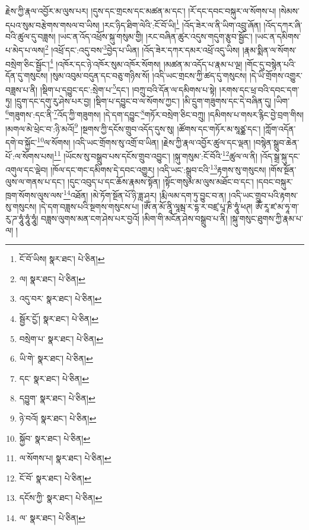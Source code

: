 རྗེས་ཀྱི་རྣལ་འབྱོར་མ་ལུས་པར། །དུས་དང་གྲངས་དང་མཚན་མ་དང་། །རོ་དང་དབང་བསྐུར་ལ་སོགས་པ། །སེམས་དཔའ་སུམ་བརྩེགས་གསལ་བ་ཡིས། །རང་ཉིད་ཐིག་ལེའི་:ངོ་བོ་ཡི།\footnote{ངོ་བོ་ཡིས།  སྣར་ཐང་།  པེ་ཅིན། } །འོད་ཟེར་ལ་ནི་ཡིག་འབྲུ་ཞོན། །འོད་དཀར་ཞི་བའི་ཚུལ་དུ་བཟླས། །ཡང་ན་འོད་འཕྲོས་སྐུ་གསུམ་གྱི། །རང་བཞིན་ཚུར་འདུས་གདུག་རྩུབ་སྦྱོང་། །ཡང་ན་དམིགས་པ་མེད་པ་ལས།\footnote{ལ།  སྣར་ཐང་།  པེ་ཅིན། } །འཕྲོ་དང་:འདུ་བས་\footnote{འདུ་བར་  སྣར་ཐང་།  པེ་ཅིན། }བྱེད་པ་ཡིན། །འོད་ཟེར་དཀར་དམར་འཕྲོ་འདུ་ཡིས། །རྣམ་སྨིན་ལ་སོགས་བསྲེག་ཅིང་སྦྱོང་།\footnote{སྦྱོར་ྱོང་།  སྣར་ཐང་།  པེ་ཅིན། } །འཁོར་དང་ཉེ་འཁོར་སུམ་འཁོར་སོགས། །མཚན་མ་འདོད་པ་རྣམ་པ་ལྔ། །གོང་དུ་བསྙེན་པའི་དོན་དུ་གསུངས། །སུམ་འབུམ་བདུན་དང་བཅུ་གཉིས་སོ། །འདི་ཡང་གྲངས་ཀྱི་ཚད་དུ་གསུངས། །དེ་ཡི་གྲོགས་འགྱུར་བཟླས་པ་ནི། །སྡིག་པ་དབྱུང་དང་:སྲེག་པ་\footnote{བསྲེག་པ་  སྣར་ཐང་།  པེ་ཅིན། }དང་། །བཀྲུ་བའི་དོན་ལ་དམིགས་པ་སྟེ། །རགས་དང་ཕྲ་བའི་དབང་དག་ཏུ། །དྲུག་དང་དགུ་རུ་ཤེས་པར་བྱ། །སྡིག་པ་དབྱུང་བ་ལ་སོགས་ཀྱང་། །མི་དྲུག་གཟུགས་དང་དེ་བཞིན་དུ། །ཡིག་\footnote{ཡི་གེ་  སྣར་ཐང་།  པེ་ཅིན། }གཟུགས་:དང་ནི་\footnote{དང་  སྣར་ཐང་།  པེ་ཅིན། }འོད་ཀྱི་གཟུགས། །དེ་དག་དབྱུང་\footnote{དབྱུག་  སྣར་ཐང་།  པེ་ཅིན། }གཏོར་བསྲེག་ཅིང་བཀྲུ། །དམིགས་པ་གསར་རྙིང་བྱེ་བྲག་གིས། །མགལ་མེ་ཕྲེང་བ་:ཉི་མའོ།\footnote{ཉེ་བའོ།  སྣར་ཐང་།  པེ་ཅིན། } །སྔགས་ཀྱི་དངོས་གྲུབ་འདོད་དུས་སུ། །ཚོགས་དང་གཏོར་མ་སཱཙྪ་དང་། །ཀློག་འདོན་དགེ་བ་སྐྱོང་\footnote{སྐྱོབ་  སྣར་ཐང་།  པེ་ཅིན། }ལ་སོགས། །འདི་ཡང་གྲོགས་སུ་འགྲོ་བ་ཡིན། །རྗེས་ཀྱི་རྣལ་འབྱོར་ཚུལ་དང་ལྡན། །བསྙེན་སྒྲུབ་ཆེན་པོ་:ལ་སོགས་པས།\footnote{ལ་སོགས་པ།  སྣར་ཐང་།  པེ་ཅིན། } །ཡོངས་སུ་བསྒྲུབ་པས་དངོས་གྲུབ་འབྱུང་། །སྐུ་གསུམ་:ངོ་བོའི་\footnote{ངོ་བོ་  སྣར་ཐང་།  པེ་ཅིན། }ཚུལ་ལ་ནི། །འོད་སྒྲ་སྐུ་དང་འགུལ་དང་ལྡེབ། །ཁོལ་དང་གང་དམིགས་དེ་དབང་འགྱུར། །འདི་ཡང་:སྒྲུབ་ངའི་\footnote{དངོས་ཀྱི་  སྣར་ཐང་།  པེ་ཅིན། }རྟགས་སུ་གསུངས། །གོས་སྔོན་ལུས་ལ་གནས་པ་དང་། །དུང་འབུད་པ་དང་ཆོས་རྣམས་སྟོན། །སྟོང་གསུམ་མ་ལུས་མཐོང་བ་དང་། །དབང་བསྐུར་ཁྲག་སོགས་ལུས་ལས་\footnote{ལ་  སྣར་ཐང་།  པེ་ཅིན། }འཐོན། །མེ་ཏོག་སྔོན་པོ་ཉི་ཟླ་ཤར། །རྨི་ལམ་དག་ཏུ་བྱུང་བ་ན། །འདི་ཡང་གྲུབ་པའི་རྟགས་སུ་གསུངས། །དེ་དག་བཟླས་པའི་སྔགས་གསུངས་པ། །ཨོཾ་ན་མོ་ནཱི་ལཱམྦ་ར་དྷ་ར་བཛྲ་པཱ་ཎི་ཧཱུཾ་ཕཊ། ཨོཾ་རཱ་ཛ་མ་ཧཱ་ག་རུ་ཌ་ཧཱུཾ་ཧཱུཾ་ཧཱུཾ། བཟླས་ལུགས་མན་ངག་ཤེས་པར་བྱའོ། །མིག་གི་མངོན་ཤེས་བསྒྲུབ་པ་ནི། །སྐུ་གསུང་ཐུགས་ཀྱི་རྣམ་པ་ལ། །
